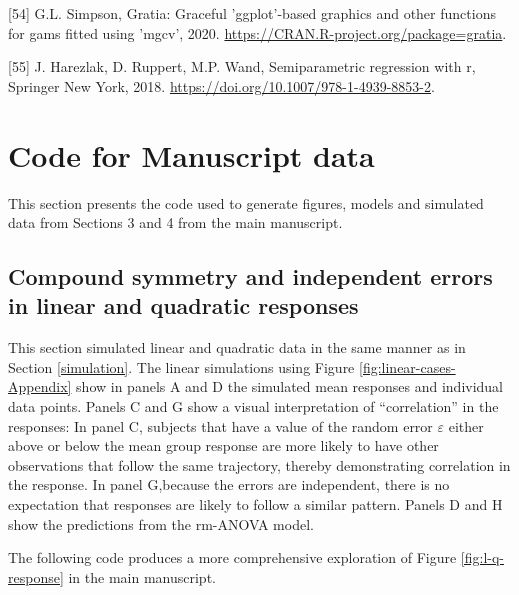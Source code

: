 \documentclass[
]{article}
\begin{document}
\leavevmode\hypertarget{ref-gratia}{}%
{[}54{]} G.L. Simpson, Gratia: Graceful 'ggplot'-based graphics and other functions for gams fitted using 'mgcv', 2020. \url{https://CRAN.R-project.org/package=gratia}.

\leavevmode\hypertarget{ref-harezlak2018}{}%
{[}55{]} J. Harezlak, D. Ruppert, M.P. Wand, Semiparametric regression with r, Springer New York, 2018. \url{https://doi.org/10.1007/978-1-4939-8853-2}.

\hypertarget{appendix-appendix}{%
\appendix}


\hypertarget{code-for-manuscript-data}{%
\section{Code for Manuscript data}\label{code-for-manuscript-data}}

This section presents the code used to generate figures, models and simulated data from Sections 3 and 4 from the main manuscript.

\hypertarget{compound-symmetry-and-independent-errors-in-linear-and-quadratic-responses}{%
\subsection{Compound symmetry and independent errors in linear and quadratic responses}\label{compound-symmetry-and-independent-errors-in-linear-and-quadratic-responses}}

This section simulated linear and quadratic data in the same manner as in Section \ref{simulation}. The linear simulations using Figure \ref{fig:linear-cases-Appendix} show in panels A and D the simulated mean responses and individual data points. Panels C and G show a visual interpretation of ``correlation'' in the responses: In panel C, subjects that have a value of the random error \(\varepsilon\) either above or below the mean group response are more likely to have other observations that follow the same trajectory, thereby demonstrating correlation in the response. In panel G,because the errors are independent, there is no expectation that responses are likely to follow a similar pattern. Panels D and H show the predictions from the rm-ANOVA model.

The following code produces a more comprehensive exploration of Figure \ref{fig:l-q-response} in the main manuscript.
\end{document}
